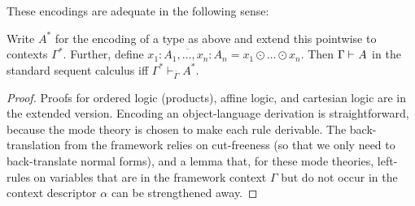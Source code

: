 \documentclass[a4paper,USenglish]{lipics-v2016}
\newcommand\seq[3]{\ensuremath{#1 \vdash_{#2} #3}}
\newcommand\seql[3]{\ensuremath{#1 \vdash^{\dsd{#2}} #3}}
\newcommand\vars[1]{\ensuremath{\overline{#1}}}
\begin{document}
These encodings are adequate in the following sense:
\begin{theorem}
Write $A^*$ for the encoding of a type as above and extend this
pointwise to contexts $\Gamma^*$.  Further, define
$\vars{x_1:A_1,\ldots,x_n:A_n} = x_1 \odot \ldots \odot x_n$.  Then
$\seql{\Gamma}{}{A}$ in the standard sequent calculus iff
$\seq{\Gamma^*}{\vars{\Gamma}}{A^*}$.
\end{theorem}
\begin{proof}
Proofs for ordered logic (products), affine logic, and cartesian logic
are in the extended version. Encoding an object-language derivation is
straightforward, because the mode theory is chosen to make each rule
derivable.  The back-translation from the framework relies on
cut-freeness (so that we only need to back-translate normal forms), and
a lemma that, for these mode theories, left-rules on variables that are
in the framework context $\Gamma$ but do not occur in the context
descriptor $\alpha$ can be strengthened away.
\end{proof}
\end{document}
